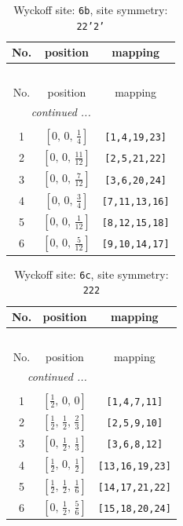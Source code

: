 \documentclass[fleqn,8pt]{jsarticle}
\begin{document}
\begin{longtable}{ccc}
\caption{Wyckoff site: {\tt 6b}, site symmetry: {\tt 22'2'}}
 \\
 \hline \hline
No. & position & mapping \\ \hline \endfirsthead

\multicolumn{2}{l}{\tablename\ \thetable{}} \\
 \hline \hline
No. & position & mapping \\ \hline \endhead

 \hline \hline
\multicolumn{2}{r}{\footnotesize\it continued ...} \\ \endfoot

 \hline \hline
\multicolumn{2}{r}{} \\ \endlastfoot

1 & $\left[ 0,\, 0,\, \frac{1}{4} \right]$ & {\tt [1,4,19,23]} \\ \hline
2 & $\left[ 0,\, 0,\, \frac{11}{12} \right]$ & {\tt [2,5,21,22]} \\ \hline
3 & $\left[ 0,\, 0,\, \frac{7}{12} \right]$ & {\tt [3,6,20,24]} \\ \hline
4 & $\left[ 0,\, 0,\, \frac{3}{4} \right]$ & {\tt [7,11,13,16]} \\ \hline
5 & $\left[ 0,\, 0,\, \frac{1}{12} \right]$ & {\tt [8,12,15,18]} \\ \hline
6 & $\left[ 0,\, 0,\, \frac{5}{12} \right]$ & {\tt [9,10,14,17]} \\
\end{longtable}
\renewcommand{\arraystretch}{1.2}
\begin{longtable}{ccc}
\caption{Wyckoff site: {\tt 6c}, site symmetry: {\tt 222}}
 \\
 \hline \hline
No. & position & mapping \\ \hline \endfirsthead

\multicolumn{2}{l}{\tablename\ \thetable{}} \\
 \hline \hline
No. & position & mapping \\ \hline \endhead

 \hline \hline
\multicolumn{2}{r}{\footnotesize\it continued ...} \\ \endfoot

 \hline \hline
\multicolumn{2}{r}{} \\ \endlastfoot

1 & $\left[ \frac{1}{2},\, 0,\, 0 \right]$ & {\tt [1,4,7,11]} \\ \hline
2 & $\left[ \frac{1}{2},\, \frac{1}{2},\, \frac{2}{3} \right]$ & {\tt [2,5,9,10]} \\ \hline
3 & $\left[ 0,\, \frac{1}{2},\, \frac{1}{3} \right]$ & {\tt [3,6,8,12]} \\ \hline
4 & $\left[ \frac{1}{2},\, 0,\, \frac{1}{2} \right]$ & {\tt [13,16,19,23]} \\ \hline
5 & $\left[ \frac{1}{2},\, \frac{1}{2},\, \frac{1}{6} \right]$ & {\tt [14,17,21,22]} \\ \hline
6 & $\left[ 0,\, \frac{1}{2},\, \frac{5}{6} \right]$ & {\tt [15,18,20,24]} \\
\end{longtable}
\end{document}
